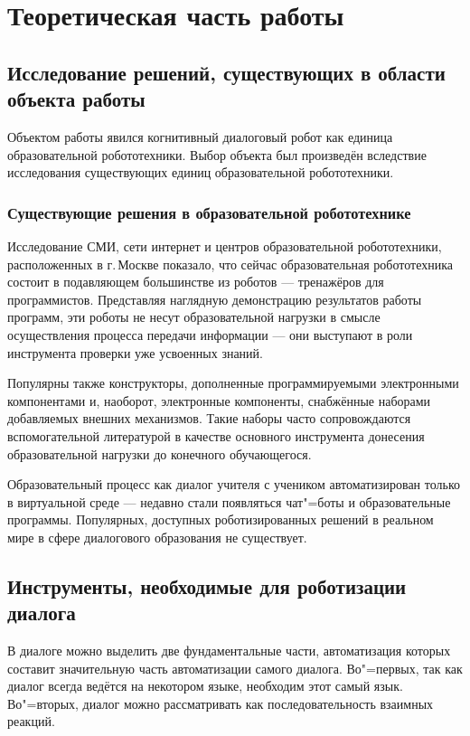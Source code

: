 \chapter{Теоретическая часть работы}

\section{Исследование решений, существующих в области объекта работы}

Объектом работы явился когнитивный диалоговый робот как единица образовательной робототехники. Выбор объекта был произведён вследствие исследования существующих единиц образовательной робототехники.

\subsection{Существующие решения в образовательной робототехнике}

Исследование СМИ, сети интернет и центров образовательной робототехники, расположенных в г.\,Москве показало, что сейчас образовательная робототехника состоит в подавляющем большинстве из роботов --- тренажёров для программистов. Представляя наглядную демонстрацию результатов работы программ, эти роботы не несут образовательной нагрузки в смысле осуществления процесса передачи информации --- они выступают в роли инструмента проверки уже усвоенных знаний. 

Популярны также конструкторы, дополненные программируемыми электронными компонентами и, наоборот, электронные компоненты, снабжённые наборами добавляемых внешних механизмов. Такие наборы часто сопровождаются вспомогательной литературой в качестве основного инструмента донесения образовательной нагрузки до конечного обучающегося.

Образовательный процесс как диалог учителя с учеником автоматизирован только в виртуальной среде --- недавно стали появляться чат"=боты и образовательные программы. Популярных, доступных роботизированных решений в реальном мире в сфере диалогового образования не существует.

\section{Инструменты, необходимые для роботизации диалога}\label{dialogue-instruments}
В диалоге можно выделить две фундаментальные части, автоматизация которых составит значительную часть автоматизации самого диалога. Во"=первых, так как диалог всегда ведётся на некотором языке, необходим этот самый язык. Во"=вторых, диалог можно рассматривать как последовательность взаимных реакций.

